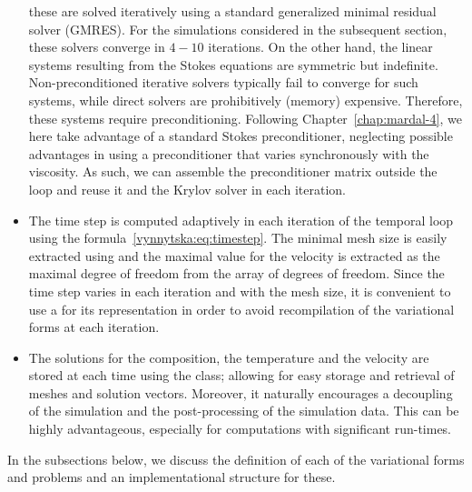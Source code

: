 \begin{itemize}
  these are solved iteratively using a standard generalized minimal
  residual solver (GMRES). For the simulations considered in the
  subsequent section, these solvers converge in $4 - 10$ iterations.
  On the other hand, the linear systems resulting from the Stokes
  equations are symmetric but indefinite. Non-preconditioned iterative
  solvers typically fail to converge for such systems, while direct
  solvers are prohibitively (memory) expensive. Therefore, these
  systems require preconditioning. Following
  Chapter~\ref{chap:mardal-4}, we here take advantage of a standard
  Stokes preconditioner, neglecting possible advantages in using a
  preconditioner that varies synchronously with the viscosity.  As
  such, we can assemble the preconditioner matrix outside the loop and
  reuse it and the Krylov solver in each iteration.
\item
  The time step  is computed adaptively in each iteration of
  the temporal loop using the
  formula~\eqref{vynnytska:eq:timestep}. The minimal mesh size is
  easily extracted using  and the maximal value for
  the velocity is extracted as the maximal degree of freedom from
  the  array of degrees of freedom. Since the time step
  varies in each iteration and with the mesh size, it is convenient to
  use a  for its representation in order to avoid
  recompilation of the variational forms at each iteration.
\item
  The solutions for the composition, the temperature and the velocity
  are stored at each time using the  class; allowing
  for easy storage and retrieval of meshes and solution
  vectors. Moreover, it naturally encourages a decoupling of the
  simulation and the post-processing of the simulation data. This can
  be highly advantageous, especially for computations with significant
  run-times.
\end{itemize}
In the subsections below, we discuss the definition of each of the
variational forms and problems and an implementational structure for
these.


